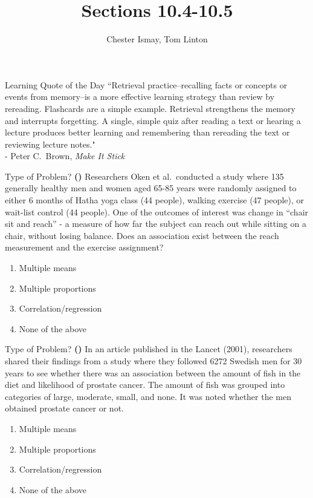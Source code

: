 \documentclass[13pt]{beamer}
\title{Sections 10.4-10.5}
\author{Chester Ismay, Tom Linton}
\institute{Ripon College, Central College}
\date{}
\newcounter{count}
\newcommand{\quotes}[2]{\centering \Large{``#1"\\
\vspace*{0.2in}
\hspace*{0.5in} - #2}}
\newcommand{\question}{ \textbf{(\decimal{count})} \stepcounter{count}}
\newenvironment{click}{\begin{enumerate}[A]}{\end{enumerate}}
\begin{document}
\begin{frame}
  \titlepage
\end{frame}


\begin{frame}{Learning Quote of the Day}
\quotes{Retrieval practice--recalling facts or concepts or events from memory--is a more effective learning strategy than review by rereading. Flashcards are a simple example. Retrieval strengthens the memory and interrupts forgetting. A single, simple quiz after reading a text or hearing a lecture produces better learning and remembering than rereading the text or reviewing lecture notes.}{Peter C.\ Brown, {\it Make It Stick}}
\end{frame}

\begin{frame}{Type of Problem?}
\question Researchers Oken et al.\ conducted a study where 135 generally
healthy men and women aged 65-85 years were randomly assigned to either 6 months of Hatha yoga class (44 people), walking exercise (47 people), or wait-list control (44 people). One of the outcomes of interest was change in ``chair sit and reach” - a measure of how far the subject can reach out while sitting on a
chair, without losing balance.  Does an association exist between the reach measurement and the exercise assignment?

\begin{click}
   \item Multiple means %
   \item Multiple proportions
   \item Correlation/regression
   \item None of the above
\end{click}
\end{frame}

\begin{frame}{Type of Problem?}
\question In an article published in the Lancet (2001), researchers shared their findings from a study where they followed 6272 Swedish men for 30 years to see whether there was an association between the amount of fish in the diet and likelihood of prostate cancer.  The amount of fish was grouped into categories of large, moderate, small, and none.  It was noted whether the men obtained prostate cancer or not.

\begin{click}
   \item Multiple means
   \item Multiple proportions %
   \item Correlation/regression
   \item None of the above
\end{click}
\end{frame}
\end{document}
